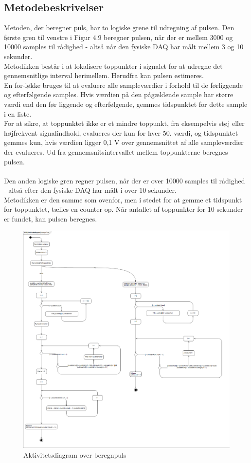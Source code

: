 \subsection{Metodebeskrivelser}
Metoden, der beregner puls, har to logiske grene til udregning af pulsen. Den første gren til venstre i Figur 4.9 beregner pulsen, når der er mellem 3000 og 10000 samples til rådighed - altså når den fysiske DAQ har målt mellem 3 og 10 sekunder.\\
Metodikken består i at lokalisere toppunkter i signalet for at udregne det gennemsnitlige interval herimellem. Herudfra kan pulsen estimeres. \\
En for-løkke bruges til at evaluere alle sampleværdier i forhold til de førliggende og efterfølgende samples. Hvis værdien på den pågældende sample har større værdi end den før liggende og efterfølgende, gemmes tidspunktet for dette sample i en liste.\\ 
For at sikre, at toppunktet ikke er et mindre toppunkt, fra eksempelvis støj eller højfrekvent signalindhold, evalueres der kun for hver 50. værdi, og tidspunktet gemmes kun, hvis værdien ligger 0,1 V over gennemsnittet af alle sampleværdier der evalueres. Ud fra gennemsnitsintervallet mellem toppunkterne beregnes pulsen.
\\
\\
Den anden logiske gren regner pulsen, når der er over 10000 samples til rådighed - altså efter den fysiske DAQ har målt i over 10 sekunder.\\ 
Metodikken er den samme som ovenfor, men i stedet for at gemme et tidspunkt for toppunktet, tælles en counter op. Når antallet af toppunkter for 10 sekunder er fundet, kan pulsen beregnes.

\begin{figure}[H]
	\centering
	\includegraphics[width=1\textwidth]{Figurer/aktivitetsdiagram_beregnPuls}
	\caption{Aktivitetsdiagram over beregnpuls}
\end{figure}


